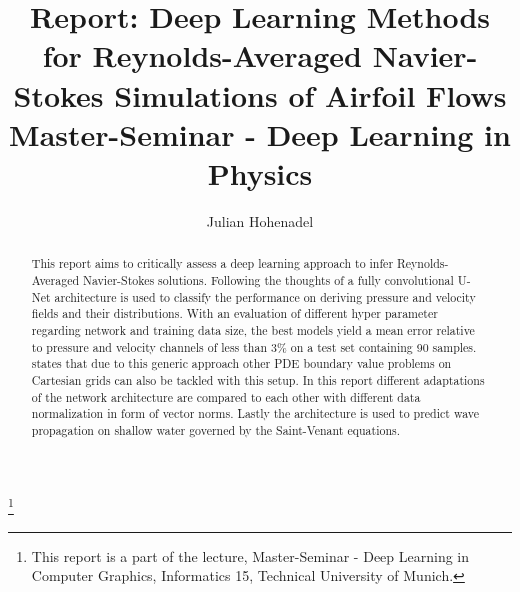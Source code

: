 \documentclass[acmtog]{techreportacmart}
\begin{document}
\title{Report: Deep Learning Methods for Reynolds-Averaged Navier-Stokes Simulations of
Airfoil Flows \\ Master-Seminar - Deep Learning in Physics} 
\author{Julian Hohenadel}

\renewcommand\shortauthors{Hohenadel}

\begin{abstract}
This report aims to critically assess a deep learning approach to infer Reynolds-Averaged Navier-Stokes solutions. Following the thoughts of \cite{Thuerey20} a fully convolutional U-Net architecture is used to classify the performance on deriving pressure and velocity fields and their distributions. With an evaluation of different hyper parameter regarding network and training data size, the best models yield a mean error relative to pressure and velocity channels of less than 3\% on a test set containing 90 samples. \cite{Thuerey20} states that due to this generic approach other PDE boundary value problems on Cartesian grids can also be tackled with this setup. In this report different adaptations of the network architecture are compared to each other with different data normalization in form of vector norms. Lastly the architecture is used to predict wave propagation on shallow water governed by the Saint-Venant equations.
\end{abstract}

%
%



\thanks{This report is a part of the lecture, Master-Seminar - Deep Learning in
  Computer Graphics, Informatics 15, Technical University of Munich.}


\maketitle
\end{document}
